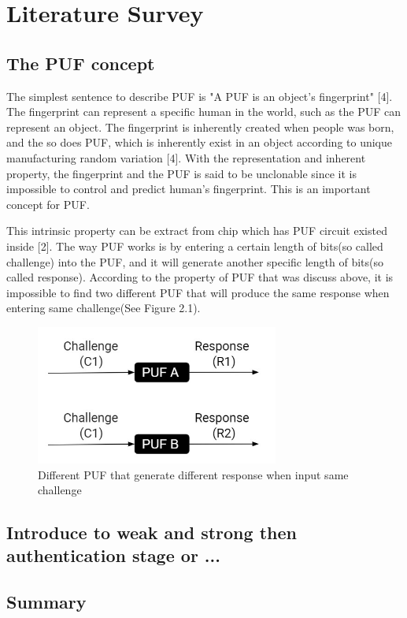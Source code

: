 \chapter{Literature Survey}

\section{The PUF concept}
The simplest sentence to describe PUF is "A PUF is an object's fingerprint" [4]. The fingerprint can represent a specific human in the world, such as the PUF can represent
an object. The fingerprint is inherently created when people was born, and the so does PUF, which is inherently exist in an object according to unique manufacturing random variation [4].
With the representation and inherent property, the fingerprint and the PUF is said to be unclonable since it is impossible to control and predict human's fingerprint. This is an important concept for PUF. \par

This intrinsic property can be extract from chip which has PUF circuit existed inside [2]. The way PUF works is by entering a certain length of bits(so called challenge) into the PUF, and it will
generate another specific length of bits(so called response). According to the property of PUF that was discuss above, it is impossible to find two different PUF that will produce the same response when entering same challenge(See Figure 2.1).
\begin{figure}[b]
\centering
\includegraphics[width=8cm]{figures/figure1.jpg}
\caption{Different PUF that generate different response when input same challenge}
\label{fig:graph}
\end{figure}

\section{Introduce to weak and strong then authentication stage or ...}

\section{Summary}


